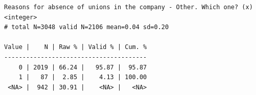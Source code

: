 \documentclass[
  letterpaper,
  DIV=11,
  numbers=noendperiod]{scrreprt}
\newenvironment{Shaded}{\begin{snugshade}}{\end{snugshade}}
\newcommand{\FunctionTok}[1]{\textcolor[rgb]{0.28,0.35,0.67}{#1}}
\newcommand{\NormalTok}[1]{\textcolor[rgb]{0.00,0.23,0.31}{#1}}
\newcommand{\SpecialCharTok}[1]{\textcolor[rgb]{0.37,0.37,0.37}{#1}}
\begin{document}
\begin{Shaded}
\end{Shaded}

\begin{verbatim}
Reasons for absence of unions in the company - Other. Which one? (x) <integer> 
# total N=3048 valid N=2106 mean=0.04 sd=0.20

Value |    N | Raw % | Valid % | Cum. %
---------------------------------------
    0 | 2019 | 66.24 |   95.87 |  95.87
    1 |   87 |  2.85 |    4.13 | 100.00
 <NA> |  942 | 30.91 |    <NA> |   <NA>
\end{verbatim}
\end{document}
